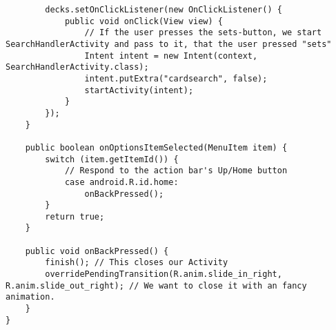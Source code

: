 \begin{lstlisting}
        decks.setOnClickListener(new OnClickListener() {
            public void onClick(View view) {
                // If the user presses the sets-button, we start SearchHandlerActivity and pass to it, that the user pressed "sets"
                Intent intent = new Intent(context, SearchHandlerActivity.class);
                intent.putExtra("cardsearch", false);
                startActivity(intent);
            }
        });
    }

    public boolean onOptionsItemSelected(MenuItem item) {
        switch (item.getItemId()) {
            // Respond to the action bar's Up/Home button
            case android.R.id.home:
                onBackPressed();
        }
        return true;
    }

    public void onBackPressed() {
        finish(); // This closes our Activity
        overridePendingTransition(R.anim.slide_in_right, R.anim.slide_out_right); // We want to close it with an fancy animation.
    }
}

\end{lstlisting}
\newpage

